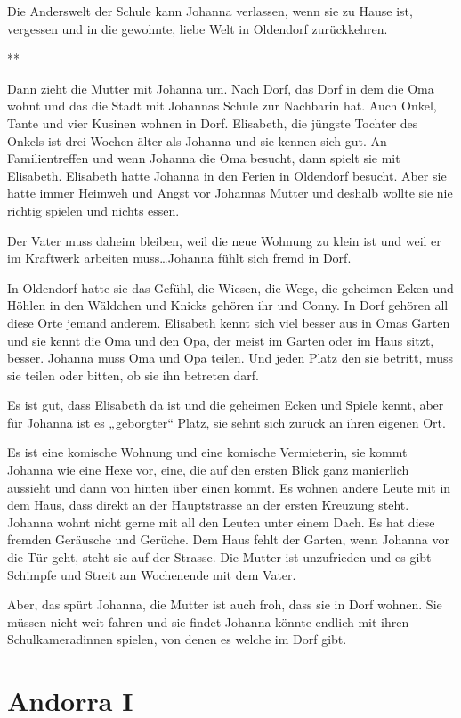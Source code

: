 \documentclass[10pt,titlepage,a5paper]{book}
\newcommand{\sterne}{\par{\centering ***\par}}
\begin{document}
Die Anderswelt der Schule kann Johanna verlassen, wenn sie zu Hause ist, vergessen und in die gewohnte, liebe Welt in Oldendorf  zurückkehren.


\sterne


Dann zieht die Mutter mit Johanna um. Nach Dorf, das Dorf in dem die Oma wohnt und das die Stadt mit Johannas Schule zur Nachbarin hat. Auch Onkel, Tante und vier Kusinen wohnen in Dorf. Elisabeth, die jüngste Tochter des Onkels ist drei Wochen älter als Johanna und sie kennen sich gut. An Familientreffen und wenn Johanna die Oma besucht, dann spielt sie mit Elisabeth. Elisabeth hatte Johanna in den Ferien in Oldendorf besucht. Aber sie hatte immer Heimweh und Angst vor Johannas Mutter und deshalb wollte sie nie richtig spielen und nichts essen.

Der Vater muss daheim bleiben, weil die neue Wohnung zu klein ist und weil er im Kraftwerk arbeiten muss\dots Johanna fühlt sich fremd in Dorf.

In Oldendorf hatte sie das Gefühl, die Wiesen, die Wege, die geheimen Ecken und Höhlen in den Wäldchen und Knicks gehören ihr und Conny. In Dorf gehören all diese Orte jemand anderem. Elisabeth kennt sich viel besser aus in Omas Garten und sie kennt die Oma und den Opa, der meist im Garten oder im Haus sitzt, besser. Johanna muss Oma und Opa teilen. Und jeden Platz den sie betritt, muss sie teilen oder bitten, ob sie ihn betreten darf.

Es ist gut, dass Elisabeth da ist und die geheimen Ecken und Spiele kennt, aber für Johanna ist es „geborgter“ Platz, sie sehnt sich zurück an ihren eigenen Ort.

Es ist eine komische Wohnung und eine komische Vermieterin, sie kommt Johanna wie eine Hexe vor, eine, die auf den ersten Blick ganz manierlich aussieht und dann von hinten über einen kommt. Es wohnen andere Leute mit in dem Haus, dass direkt an der Hauptstrasse an der ersten Kreuzung steht. Johanna wohnt nicht gerne mit all den Leuten unter einem Dach. Es hat diese fremden Geräusche und Gerüche. Dem Haus fehlt der Garten, wenn Johanna vor die Tür geht, steht sie auf der Strasse. Die Mutter ist unzufrieden und es gibt Schimpfe und Streit am Wochenende mit dem Vater. 

Aber, das spürt Johanna, die Mutter ist auch froh, dass sie in Dorf wohnen. Sie müssen nicht weit fahren und sie findet Johanna könnte endlich mit ihren Schulkameradinnen spielen, von denen es welche im Dorf gibt. 


\section*{Andorra I}
\end{document}
